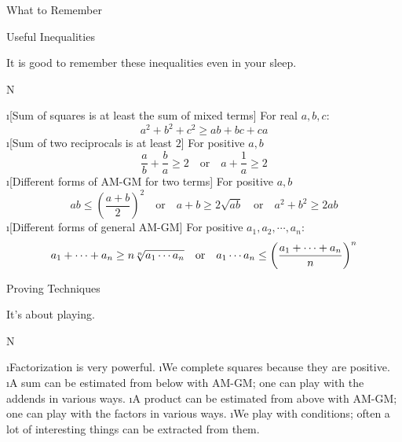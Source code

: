 
\sec What to Remember

\secc Useful Inequalities

It is good to remember these inequalities even in your sleep.

\begitems \style N

\i [Sum of squares is at least the sum of mixed terms] For real $a,b,c$: 
$$
a^2+b^2+c^2 \ge ab+bc+ca
$$
\i [Sum of two reciprocals is at least $2$] For positive $a,b$
$$
\frac ab + \frac ba \ge 2  \quad\text{or}\quad a + \frac 1a \ge 2
$$
\i [Different forms of AM-GM for two terms] For positive $a,b$
$$
ab \leq \left(\frac{a+b}{2}\right)^2 \quad\text{or}\quad
a+b \ge 2\sqrt{ab} \quad\text{or}\quad
a^2+b^2 \ge 2ab
$$
\i [Different forms of general AM-GM] For positive $a_1,a_2,\cdots,a_n$:
$$
a_1+\cdots+a_n \ge n \root n \of {a_1\cdots a_n}  \quad\text{or}\quad
a_1 \cdots a_n \leq \left(\frac{a_1+\cdots+a_n}{n}\right)^n
$$
\enditems 

\secc Proving Techniques

It's about playing.

\begitems \style N

\i Factorization is very powerful.
\i We complete squares because they are positive.
\i A sum can be estimated from below with AM-GM; one can play with the addends in various ways.
\i A product can be estimated from above with AM-GM; one can play with the factors in various ways.
\i We play with conditions; often a lot of interesting things can be extracted from them.

